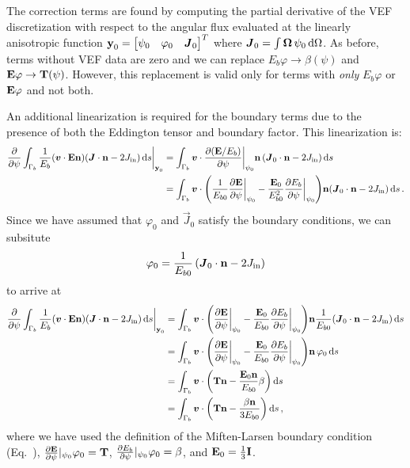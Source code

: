 \documentclass[../doc.tex]{subfiles}
\begin{document}
The correction terms are found by computing the partial derivative of the VEF discretization with respect to the angular flux evaluated at the linearly anisotropic function $\boldsymbol{\mathrm{y}}_0 = \begin{bmatrix} \psi_0 & \varphi_0 & \boldsymbol{J}_0 \end{bmatrix}^T$ where $\boldsymbol{J}_0 = \int \boldsymbol{\Omega}\,\psi_0 \mathop{}\!\mathrm{d} \Omega$. As before, terms without VEF data are zero and we can replace $E_b\varphi \rightarrow \beta(\psi)$ and $\boldsymbol{\mathrm{E}}\varphi \rightarrow \boldsymbol{\mathrm{T}}(\psi)$. However, this replacement is valid only for terms with \emph{only} $E_b\varphi$ or $\boldsymbol{\mathrm{E}}\varphi$ and not both. 

An additional linearization is required for the boundary terms due to the presence of both the Eddington tensor and boundary factor. This linearization is: 
	\begin{equation}
	\begin{aligned}
		\frac{\partial }{\partial \psi}\int_{\Gamma_b} \frac{1}{E_b}\!\left( \boldsymbol{v}\cdot\boldsymbol{\mathrm{E}}\boldsymbol{\mathrm{n}} \right)\!\left( \boldsymbol{J}\cdot\boldsymbol{\mathrm{n}} - 2J_\text{in} \right) \mathop{}\!\mathrm{d} s \biggr\rvert_{\boldsymbol{\mathrm{y}}_0} &= \int_{\Gamma_b} \boldsymbol{v}\cdot\frac{\partial (\boldsymbol{\mathrm{E}}/E_b)}{\partial \psi}\biggr\rvert_{\psi_0}\boldsymbol{\mathrm{n}}\left( \boldsymbol{J}_0\cdot\boldsymbol{\mathrm{n}} - 2J_\text{in} \right) \mathop{}\!\mathrm{d} s \\
		&= \int_{\Gamma_b} \boldsymbol{v} \cdot \left( \frac{1}{E_{b0}}\frac{\partial \boldsymbol{\mathrm{E}}}{\partial \psi}\biggr\rvert_{\psi_0} - \frac{\boldsymbol{\mathrm{E}}_0}{E_{b0}^2}\frac{\partial E_b}{\partial \psi}\biggr\rvert_{\psi_0} \right)\!\boldsymbol{\mathrm{n}}\!\left( \boldsymbol{J}_0\cdot\boldsymbol{\mathrm{n}} - 2J_\text{in} \right) \mathop{}\!\mathrm{d} s \,. 
	\end{aligned}
	\end{equation}
Since we have assumed that $\varphi_0$ and $\vec{J}_0$ satisfy the boundary conditions, we can subsitute 
	\begin{equation}
		\varphi_0 = \frac{1}{E_{b0}}\left( \boldsymbol{J}_0\cdot\boldsymbol{\mathrm{n}} - 2J_\text{in} \right) 
	\end{equation}
to arrive at 
	\begin{equation}
	\begin{aligned}
		\pderiv{}{\psi}\int_{\Gamma_b} \frac{1}{E_b}\!\paren{\vec{v}\cdot\E\n}\!\paren{\vec{J}\cdot\n - 2\Jin} \ud s \biggr\rvert_{\y_0} &= \int_{\Gamma_b} \vec{v}\cdot\paren{\pderiv{\E}{\psi}\biggr\rvert_{\psi_0} - \frac{\E_0}{E_{b0}} \pderiv{E_b}{\psi}\biggr\rvert_{\psi_0}}\!\n \frac{1}{E_{b0}}\!\paren{\vec{J}_0\cdot\n - 2\Jin} \ud s \\
		&= \int_{\Gamma_b} \vec{v}\cdot\paren{\pderiv{\E}{\psi}\biggr\rvert_{\psi_0} - \frac{\E_0}{E_{b0}} \pderiv{E_b}{\psi}\biggr\rvert_{\psi_0}}\!\n\,\varphi_0 \ud s \\
		&= \int_{\Gamma_b} \vec{v}\cdot\paren{\T\n - \frac{\E_0\n}{E_{b0}}\beta} \ud s \\
		&= \int_{\Gamma_b} \vec{v}\cdot\paren{\T\n - \frac{\beta\n}{3E_{b0}}} \ud s \,, 
	\end{aligned}
	\end{equation}
where we have used the definition of the Miften-Larsen boundary condition (Eq.~), $\frac{\partial \boldsymbol{\mathrm{E}}}{\partial \psi}\rvert_{\psi_0}\varphi_0 = \boldsymbol{\mathrm{T}}$, $\frac{\partial E_b}{\partial \psi}\rvert_{\psi_0}\varphi_0 = \beta$, and $\boldsymbol{\mathrm{E}}_0 = \frac{1}{3}\boldsymbol{\mathrm{I}}$. 
\end{document}
